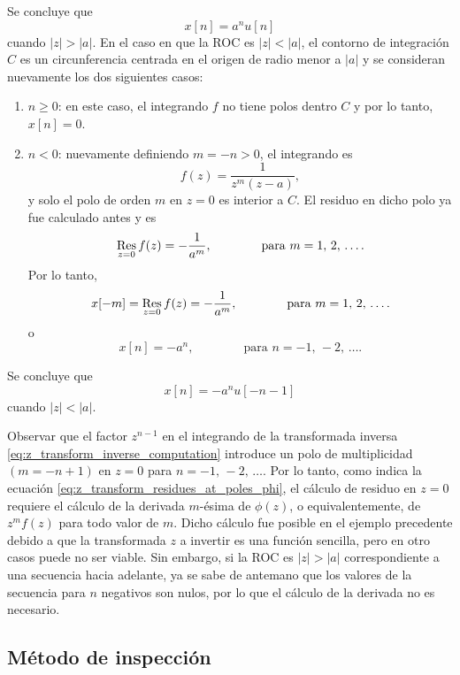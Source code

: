 \documentclass[a4paper]{report}
\def\Res{\qopname\relax m{Res}}
\begin{document}
Se concluye que 
 \[
  x[n]=a^nu[n]
 \]
cuando \(|z|>|a|\). 
En el caso en que la ROC es \(|z|<|a|\), el contorno de integración \(C\) es un circunferencia centrada en el origen de radio menor a \(|a|\) y se consideran nuevamente los dos siguientes casos:
\begin{enumerate}
 \item \(n\geq0\): en este caso, el integrando \(f\) no tiene polos dentro \(C\) y por lo tanto, \(x[n]=0\).
 \item \(n<0\): nuevamente definiendo \(m=-n>0\), el integrando es 
 \[
  f(z)=\dfrac{1}{z^m(z-a)},
 \]
 y solo el polo de orden \(m\) en \(z=0\) es interior a \(C\). El residuo en dicho polo ya fue calculado antes y es
 \[
  \Res_{z=0}f(z)=-\frac{1}{a^m},
  \qquad\qquad\textrm{para }m=1,\,2,\,\dots.
 \]
 Por lo tanto,
 \[
  x[-m]=\Res_{z=0}f(z)=-\frac{1}{a^m},
  \qquad\qquad\textrm{para }m=1,\,2,\,\dots.
 \]
 o
 \[
  x[n]=-a^n,
  \qquad\qquad\textrm{para }n=-1,\,-2,\,\dots.
 \]
\end{enumerate}
Se concluye que 
 \[
  x[n]=-a^nu[-n-1]
 \]
cuando \(|z|<|a|\).

Observar que el factor \(z^{n-1}\) en el integrando de la transformada inversa \ref{eq:z_transform_inverse_computation} introduce un polo de multiplicidad \((m=-n+1)\) en \(z=0\) para \(n=-1,\,-2,\,\dots\). Por lo tanto, como indica la ecuación \ref{eq:z_transform_residues_at_poles_phi}, el cálculo de residuo en \(z=0\) requiere el cálculo de la derivada \(m\)-ésima de \(\phi(z)\), o equivalentemente, de \(z^mf(z)\) para todo valor de \(m\). Dicho cálculo fue posible en el ejemplo precedente debido a que la transformada \(z\) a invertir es una función sencilla, pero en otro casos puede no ser viable. Sin embargo, si la ROC es \(|z|>|a|\) correspondiente a una secuencia hacia adelante, ya se sabe de antemano que los valores de la secuencia para \(n\) negativos son nulos, por lo que el cálculo de la derivada no es necesario.

\subsection{Método de inspección}
\end{document}
